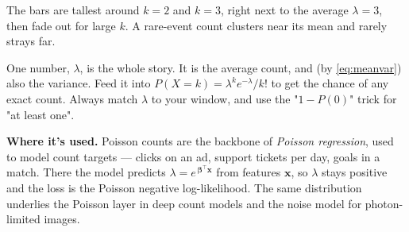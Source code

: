 \documentclass[a4paper,11pt]{article}
\newenvironment{keytakebox}{\begin{keytake}}{\end{keytake}}
\begin{document}
\begin{center}
\end{center}

\noindent The bars are tallest around $k = 2$ and $k = 3$, right next to the
average $\lambda = 3$, then fade out for large $k$. A rare-event count clusters
near its mean and rarely strays far.

\begin{keytakebox}
One number, $\lambda$, is the whole story. It is the average count, and (by
\eqref{eq:meanvar}) also the variance. Feed it into
$P(X{=}k)=\lambda^{k}e^{-\lambda}/k!$ to get the chance of any exact count.
Always match $\lambda$ to your window, and use the "$1 - P(0)$" trick for "at
least one".
\end{keytakebox}

\noindent\textbf{Where it's used.}
Poisson counts are the backbone of \emph{Poisson regression}, used to model
count targets — clicks on an ad, support tickets per day, goals in a match.
There the model predicts $\lambda = e^{\,\boldsymbol{\beta}^{\!\top}\mathbf{x}}$
from features $\mathbf{x}$, so $\lambda$ stays positive and the loss is the
Poisson negative log-likelihood. The same distribution underlies the Poisson
layer in deep count models and the noise model for photon-limited images.
\end{document}
